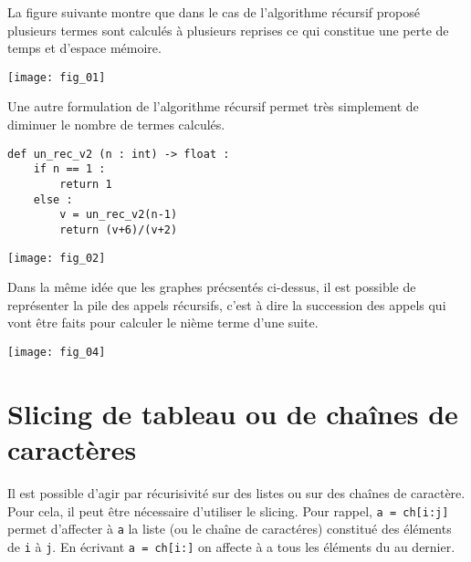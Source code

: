 La figure suivante montre que dans le cas de l'algorithme récursif proposé plusieurs termes sont calculés à plusieurs reprises ce qui constitue une perte de temps et d'espace mémoire. 

\begin{center}
\texttt{[image: fig\_01]}
\end{center}

Une autre formulation de l'algorithme récursif permet très simplement de diminuer le nombre de termes calculés. 



\noindent\begin{minipage}[c]{.45\linewidth}
\begin{lstlisting}
def un_rec_v2 (n : int) -> float :
    if n == 1 :
        return 1
    else : 
        v = un_rec_v2(n-1)
        return (v+6)/(v+2)
\end{lstlisting}
\end{minipage} \hfill
\begin{minipage}[c]{.45\linewidth}
\begin{center}
\texttt{[image: fig\_02]}
\end{center}\end{minipage}


Dans la même idée que les graphes précsentés ci-dessus, il est possible de représenter la pile des appels récursifs, c'est à dire la succession des appels qui vont être faits pour calculer le nième terme d'une suite. 

\begin{center}
\texttt{[image: fig\_04]}
\end{center}

\section{Slicing de tableau ou de chaînes de caractères}
Il est possible d'agir par récurisivité sur des listes ou sur des chaînes de caractère. Pour cela, il peut être nécessaire d'utiliser le slicing. Pour rappel, \texttt{a = ch[i:j]} permet d'affecter à \texttt{a} la liste (ou le chaîne de caractéres) constitué des éléments de \texttt{i} à \texttt{j}. En écrivant \texttt{a = ch[i:]} on affecte à a tous les éléments du \ieme au dernier.


\vspace{.5cm}

